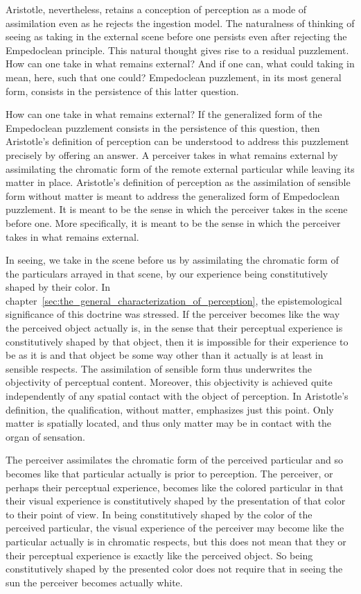 Aristotle, nevertheless, retains a conception of perception as a mode of assimilation even as he rejects the ingestion model. The naturalness of thinking of seeing as taking in the external scene before one persists even after rejecting the Empedoclean principle. This natural thought gives rise to a residual puzzlement. How can one take in what remains external? And if one can, what could taking in mean, here, such that one could? Empedoclean puzzlement, in its most general form, consists in the persistence of this latter question. 

How can one take in what remains external? If the generalized form of the Empedoclean puzzlement consists in the persistence of this question, then Aristotle's definition of perception can be understood to address this puzzlement precisely by offering an answer. A perceiver takes in what remains external by assimilating the chromatic form of the remote external particular while leaving its matter in place. Aristotle's definition of perception as the assimilation of sensible form without matter is meant to address the generalized form of Empedoclean puzzlement. It is meant to be the sense in which the perceiver takes in the scene before one. More specifically, it is meant to be the sense in which the perceiver takes in what remains external. 

In seeing, we take in the scene before us by assimilating the chromatic form of the particulars arrayed in that scene, by our experience being constitutively shaped by their color. In chapter~\ref{sec:the_general_characterization_of_perception}, the epistemological significance of this doctrine was stressed. If the perceiver becomes like the way the perceived object actually is, in the sense that their perceptual experience is constitutively shaped by that object, then it is impossible for their experience to be as it is and that object be some way other than it actually is at least in sensible respects. The assimilation of sensible form thus underwrites the objectivity of perceptual content. Moreover, this objectivity is achieved quite independently of any spatial contact with the object of perception. In Aristotle's definition, the qualification, without matter, emphasizes just this point. Only matter is spatially located, and thus only matter may be in contact with the organ of sensation. 

The perceiver assimilates the chromatic form of the perceived particular and so becomes like that particular actually is prior to perception. The perceiver, or perhaps their perceptual experience, becomes like the colored particular in that their visual experience is constitutively shaped by the presentation of that color to their point of view. In being constitutively shaped by the color of the perceived particular, the visual experience of the perceiver may become like the particular actually is in chromatic respects, but this does not mean that they or their perceptual experience is exactly like the perceived object. So being constitutively shaped by the presented color does not require that in seeing the sun the perceiver becomes actually white.

